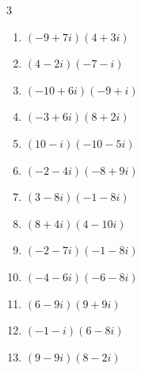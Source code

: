 \begin{multicols}{3}
\begin{enumerate}
  \item $\displaystyle (-9+7i)(4+3i)$

        \phantom{$\displaystyle =-57+i$}

  \item $\displaystyle (4-2i)(-7-i)$

        \phantom{$\displaystyle =-30+10i$}

\columnbreak %

  \item $\displaystyle (-10+6i)(-9+i)$

        \phantom{$\displaystyle =84-64i$}

  \item $\displaystyle (-3+6i)(8+2i)$

        \phantom{$\displaystyle =-36+42i$}

  \item $\displaystyle (10-i)(-10-5i)$

        \phantom{$\displaystyle =-105-40i$}

  \item $\displaystyle (-2-4i)(-8+9i)$

        \phantom{$\displaystyle =52+14i$}

  \item $\displaystyle (3-8i)(-1-8i)$

        \phantom{$\displaystyle =-67-16i$}

  \item $\displaystyle (8+4i)(4-10i)$

        \phantom{$\displaystyle =72-64i$}

  \item $\displaystyle (-2-7i)(-1-8i)$

        \phantom{$\displaystyle =-54+23i$}

  \item $\displaystyle (-4-6i)(-6-8i)$

        \phantom{$\displaystyle =-24+68i$}

  \item $\displaystyle (6-9i)(9+9i)$

        \phantom{$\displaystyle =135-27i$}

  \item $\displaystyle (-1-i)(6-8i)$

        \phantom{$\displaystyle =-14+2i$}

  \item $\displaystyle (9-9i)(8-2i)$


\end{enumerate}
\end{multicols}
